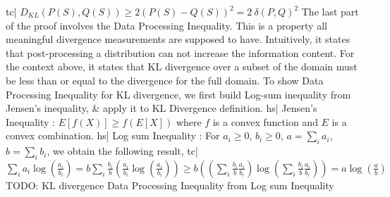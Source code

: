 tc| \( D_{KL}(P(S), Q(S)) \ge  2(P(S)-Q(S))^2 = 2 \ \delta(P,Q)^2 \)
The last part of the proof involves the Data Processing Inequality. This is a property all meaningful divergence measurements are supposed to have. Intuitively, it states that post-processing a distribution can not increase the information content. For the context above, it states that KL divergence over a subset of the domain must be less than or equal to the divergence for the full domain.
To show Data Processing Inequality for KL divergence, we first build Log-sum inequality from Jensen's inequality, & apply it to KL Divergence definition.
hs| Jensen's Inequality : \( E[f(X)] \ge f(E[X]) \) where \(f\) is a convex function and \(E\) is a convex combination.
hs| Log sum Inequality : For \(a_i \ge 0\), \(b_i \ge 0\), \(a = \sum_i a_i\), \(b = \sum_i b_i\), we obtain the following result,
tc| \( \sum_i a_i \log \left( \frac{a_i}{b_i} \right) = b \sum_i \frac{b_i}{b} \left( \frac{a_i}{b_i} \log \left( \frac{a_i}{b_i} \right) \right) \ge b \left( \left( \sum_i \frac{b_i}{b} \frac{a_i}{b_i} \right) \log \left( \sum_i \frac{b_i}{b} \frac{a_i}{b_i} \right) \right) = a \log \left( \frac{a}{b} \right) \)
TODO: KL divergence Data Processing Inequality from Log sum Inequality
